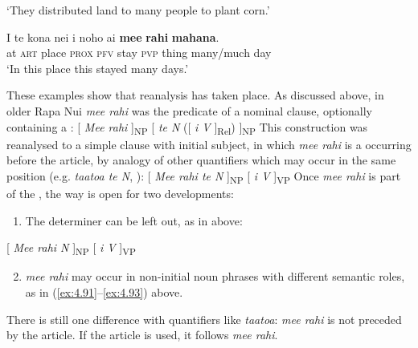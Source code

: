 \glt 
‘They distributed land to many people to plant corn.’ \textstyleExampleref{[R424.013]} 
\z

\ea\label{ex:4.93}
\gll {\ꞌ}I te kona nei i noho ai \textbf{me{\ꞌ}e} \textbf{rahi} \textbf{mahana}. \\
at \textsc{art} place \textsc{prox} \textsc{pfv} stay \textsc{pvp} thing many/much day \\

\glt
‘In this place this stayed many days.’ \textstyleExampleref{[R420.055]} 
\z

These examples show that reanalysis has taken place. As discussed above, in older Rapa Nui \textit{me{\ꞌ}e rahi} was the predicate of a nominal clause, optionally containing a :
\ea \label{ex:4.i}
[ \textit{Me{\ꞌ}e rahi} ]\textsubscript{NP} [ \textit{te N} ([ \textit{i V} ]\textsubscript{Rel}) ]\textsubscript{NP} 
\z
This construction was reanalysed to a simple clause with initial subject, in which \textit{me{\ꞌ}e rahi} is a  occurring before the article, by analogy of other quantifiers which may occur in the same position (e.g. \textit{ta{\ꞌ}ato{\ꞌ}a te N}, ):
\ea \label{ex:4.ii}
 [ \textit{Me{\ꞌ}e rahi te N} ]\textsubscript{NP} [ \textit{i V} ]\textsubscript{VP} 
\z
Once \textit{me{\ꞌ}e rahi} is part of the , the way is open for two developments:

\begin{enumerate}
\item 
The determiner can be left out, as in  above:

\end{enumerate}
\ea \label{ex:4.iii}
 [ \textit{Me{\ꞌ}e rahi N} ]\textsubscript{NP} [ \textit{i V} ]\textsubscript{VP}
\z
\begin{enumerate}
\setcounter{enumi}{1}
\item 
\textit{me{\ꞌ}e rahi} may occur in non-initial noun phrases with different semantic roles, as in (\ref{ex:4.91}–\ref{ex:4.93}) above. 

\end{enumerate}

There is still one difference with quantifiers like \textit{ta{\ꞌ}ato{\ꞌ}a}: \textit{me{\ꞌ}e rahi} is not preceded by the article. If the article is used, it follows \textit{me{\ꞌ}e rahi}.
